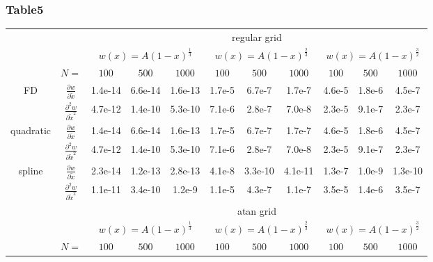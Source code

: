\subsubsection{Table5}
\begin{tabular}{cc|c|c|c|c|c|c|c|c|c|}
\cline{3-11}
& & \multicolumn{9}{|c|}{regular grid}
\\ \cline{3-11}
& & \multicolumn{3}{|c|}{$w(x)=A(1-x)^\frac{1}{3}$} &  \multicolumn{3}{|c|}{$w(x)=A(1-x)^\frac{2}{3}$} &  \multicolumn{3}{|c|}{$w(x)=A(1-x)^\frac{3}{2}$}
\\ \cline{2-11}
& \multicolumn{1}{|c|}{$N=$} & $100$ & $500$ & $1000$ & $100$ & $500$ & $1000$ & $100$ & $500$ & $1000$
\\ \cline{1-11}
\multicolumn{1}{|c|}{\multirow{2}{*}{FD}} &
\multicolumn{1}{|c|}{$\frac{\partial w}{\partial \tilde x}$}
  &1.4e-14  &6.6e-14  &1.6e-13  &1.7e-5  &6.7e-7  &1.7e-7  &4.6e-5  &1.8e-6  &4.5e-7
\\ \cline{2-11}
\multicolumn{1}{|c|}{}                        &
\multicolumn{1}{|c|}{$\frac{\partial^2 w}{\partial \tilde x^2}$}
  &4.7e-12  &1.4e-10  &5.3e-10  &7.1e-6  &2.8e-7  &7.0e-8  &2.3e-5  &9.1e-7  &2.3e-7
\\ \cline{1-11}
\multicolumn{1}{|c|}{\multirow{2}{*}{quadratic}} &
\multicolumn{1}{|c|}{$\frac{\partial w}{\partial \tilde x}$}
  &1.4e-14  &6.6e-14  &1.6e-13  &1.7e-5  &6.7e-7  &1.7e-7  &4.6e-5  &1.8e-6  &4.5e-7
\\ \cline{2-11}
\multicolumn{1}{|c|}{}                        &
\multicolumn{1}{|c|}{$\frac{\partial^2 w}{\partial \tilde x^2}$}
  &4.7e-12  &1.4e-10  &5.3e-10  &7.1e-6  &2.8e-7  &7.0e-8  &2.3e-5  &9.1e-7  &2.3e-7
\\ \cline{1-11}
\multicolumn{1}{|c|}{\multirow{2}{*}{spline}} &
\multicolumn{1}{|c|}{$\frac{\partial w}{\partial \tilde x}$}
  &2.3e-14  &1.2e-13  &2.8e-13  &4.1e-8  &3.3e-10  &4.1e-11  &1.3e-7  &1.0e-9  &1.3e-10
\\ \cline{2-11}
\multicolumn{1}{|c|}{}                        &
\multicolumn{1}{|c|}{$\frac{\partial^2 w}{\partial \tilde x^2}$}
  &1.1e-11  &3.4e-10  &1.2e-9  &1.1e-5  &4.3e-7  &1.1e-7  &3.5e-5  &1.4e-6  &3.5e-7
\\ \cline{1-11}
& & \multicolumn{9}{|c|}{atan grid}
\\ \cline{3-11}
& & \multicolumn{3}{|c|}{$w(x)=A(1-x)^\frac{1}{3}$} &  \multicolumn{3}{|c|}{$w(x)=A(1-x)^\frac{2}{3}$} &  \multicolumn{3}{|c|}{$w(x)=A(1-x)^\frac{3}{2}$}
\\ \cline{2-11}
& \multicolumn{1}{|c|}{$N=$} & $100$ & $500$ & $1000$ & $100$ & $500$ & $1000$ & $100$ & $500$ & $1000$

\end{tabular}
